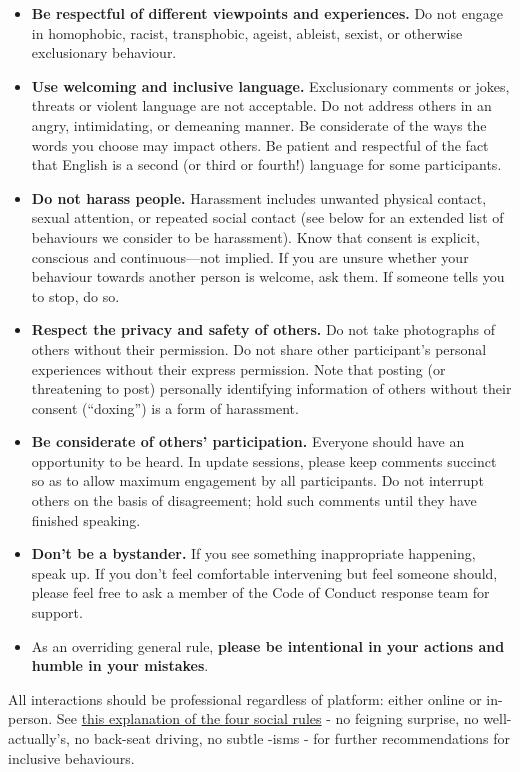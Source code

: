 \documentclass[
]{book}
\begin{document}
\begin{itemize}
\item
  \textbf{Be respectful of different viewpoints and experiences.} Do not engage in homophobic, racist, transphobic, ageist, ableist, sexist, or otherwise exclusionary behaviour.
\item
  \textbf{Use welcoming and inclusive language.} Exclusionary comments or jokes, threats or violent language are not acceptable. Do not address others in an angry, intimidating, or demeaning manner. Be considerate of the ways the words you choose may impact others. Be patient and respectful of the fact that English is a second (or third or fourth!) language for some participants.
\item
  \textbf{Do not harass people.} Harassment includes unwanted physical contact, sexual attention, or repeated social contact (see below for an extended list of behaviours we consider to be harassment). Know that consent is explicit, conscious and continuous---not implied. If you are unsure whether your behaviour towards another person is welcome, ask them. If someone tells you to stop, do so.
\item
  \textbf{Respect the privacy and safety of others.} Do not take photographs of others without their permission. Do not share other participant's personal experiences without their express permission. Note that posting (or threatening to post) personally identifying information of others without their consent (``doxing'') is a form of harassment.
\item
  \textbf{Be considerate of others' participation.} Everyone should have an opportunity to be heard. In update sessions, please keep comments succinct so as to allow maximum engagement by all participants. Do not interrupt others on the basis of disagreement; hold such comments until they have finished speaking.
\item
  \textbf{Don't be a bystander.} If you see something inappropriate happening, speak up. If you don't feel comfortable intervening but feel someone should, please feel free to ask a member of the Code of Conduct response team for support.
\item
  As an overriding general rule, \textbf{please be intentional in your actions and humble in your mistakes}.
\end{itemize}

All interactions should be professional regardless of platform: either online or in-person. See \href{https://www.recurse.com/manual\#sub-sec-social-rules}{this explanation of the four social rules} - no feigning surprise, no well-actually's, no back-seat driving, no subtle -isms - for further recommendations for inclusive behaviours.
\end{document}
